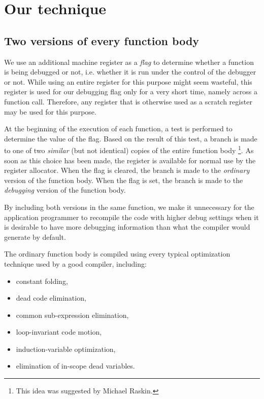 \section{Our technique}
\label{sec-our-technique}

\subsection{Two versions of every function body}
\label{sec-two-body-versions}

We use an additional machine register as a \emph{flag} to determine
whether a function is being debugged or not, i.e. whether it is run
under the control of the debugger or not.  While using an entire
register for this purpose might seem wasteful, this register is used
for our debugging flag only for a very short time, namely across a
function call.  Therefore, any register that is otherwise used as a
scratch register may be used for this purpose.

At the beginning of the execution of each function, a test is
performed to determine the value of the flag.  Based on the result of
this test, a branch is made to one of two \emph{similar} (but not
identical) copies of the entire function body%
\footnote{This idea was suggested by Michael Raskin.}.  As soon as
this choice
has been made, the register is available for normal use by the
register allocator.  When the flag is cleared, the branch is made to
the \emph{ordinary} version of the function body.  When the flag is
set, the branch is made to the \emph{debugging} version of the
function body.

By including both versions in the same function, we make it
unnecessary for the application programmer to recompile the code with
higher debug settings when it is desirable to have more debugging
information than what the compiler would generate by default.

The ordinary function body is compiled using every typical optimization
technique used by a good compiler, including:

\begin{itemize}
\item constant folding,
\item dead code elimination,
\item common sub-expression elimination,
\item loop-invariant code motion,
\item induction-variable optimization, 
\item elimination of in-scope dead variables.
\end{itemize}

